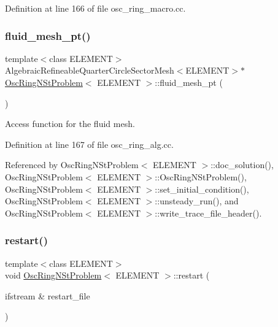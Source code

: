 Definition at line 166 of file osc\+\_\+ring\+\_\+macro.\+cc.

\mbox{\label{classOscRingNStProblem_ae9749337fca6dff52ac6e530c6339faa}} 
\subsubsection{\texorpdfstring{fluid\+\_\+mesh\+\_\+pt()}{fluid\_mesh\_pt()}\hspace{0.1cm}{\footnotesize\ttfamily [2/2]}}
{\footnotesize\ttfamily template$<$class E\+L\+E\+M\+E\+NT$>$ \\
Algebraic\+Refineable\+Quarter\+Circle\+Sector\+Mesh$<$E\+L\+E\+M\+E\+NT$>$$\ast$ \hyperlink{classOscRingNStProblem}{Osc\+Ring\+N\+St\+Problem}$<$ E\+L\+E\+M\+E\+NT $>$\+::fluid\+\_\+mesh\+\_\+pt (\begin{DoxyParamCaption}{ }\end{DoxyParamCaption})\hspace{0.3cm}{\ttfamily [inline]}}



Access function for the fluid mesh. 



Definition at line 167 of file osc\+\_\+ring\+\_\+alg.\+cc.



Referenced by Osc\+Ring\+N\+St\+Problem$<$ E\+L\+E\+M\+E\+N\+T $>$\+::doc\+\_\+solution(), Osc\+Ring\+N\+St\+Problem$<$ E\+L\+E\+M\+E\+N\+T $>$\+::\+Osc\+Ring\+N\+St\+Problem(), Osc\+Ring\+N\+St\+Problem$<$ E\+L\+E\+M\+E\+N\+T $>$\+::set\+\_\+initial\+\_\+condition(), Osc\+Ring\+N\+St\+Problem$<$ E\+L\+E\+M\+E\+N\+T $>$\+::unsteady\+\_\+run(), and Osc\+Ring\+N\+St\+Problem$<$ E\+L\+E\+M\+E\+N\+T $>$\+::write\+\_\+trace\+\_\+file\+\_\+header().

\mbox{\label{classOscRingNStProblem_a0cf01737b8d53213d644413e84251d0f}} 
\subsubsection{\texorpdfstring{restart()}{restart()}\hspace{0.1cm}{\footnotesize\ttfamily [1/2]}}
{\footnotesize\ttfamily template$<$class E\+L\+E\+M\+E\+NT$>$ \\
void \hyperlink{classOscRingNStProblem}{Osc\+Ring\+N\+St\+Problem}$<$ E\+L\+E\+M\+E\+NT $>$\+::restart (\begin{DoxyParamCaption}\item[{ifstream \&}]{restart\+\_\+file }\end{DoxyParamCaption})}



